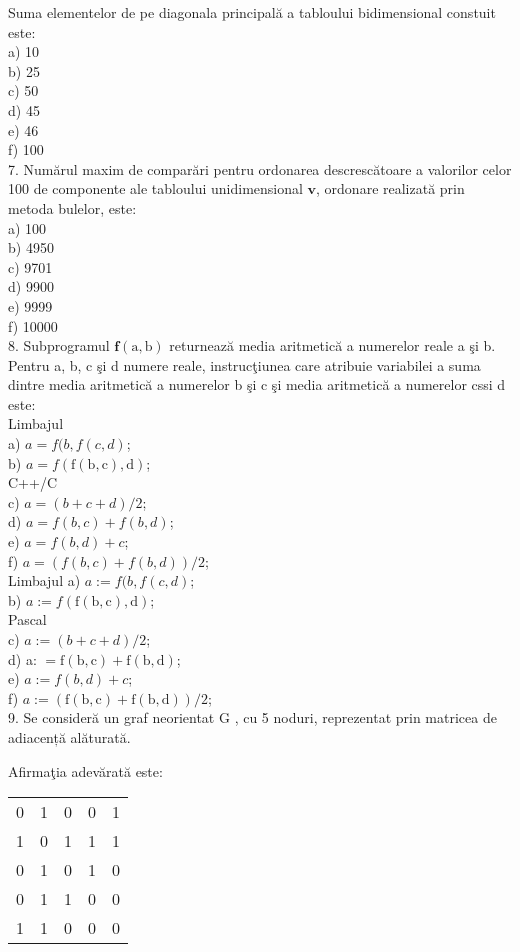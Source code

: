 Suma elementelor de pe diagonala principală a tabloului bidimensional constuit este:\\
a) 10\\
b) 25\\
c) 50\\
d) 45\\
e) 46\\
f) 100\\
7. Numărul maxim de comparări pentru ordonarea descrescătoare a valorilor celor 100 de componente ale tabloului unidimensional $\mathbf{v}$, ordonare realizată prin metoda bulelor, este:\\
a) 100\\
b) 4950\\
c) 9701\\
d) 9900\\
e) 9999\\
f) 10000\\
8. Subprogramul $\mathbf{f}(\mathrm{a}, \mathrm{b})$ returnează media aritmetică a numerelor reale a şi b. Pentru a, b, c şi d numere reale, instrucţiunea care atribuie variabilei a suma dintre media aritmetică a numerelor b şi c şi media aritmetică a numerelor cssi d este:\\
Limbajul\\
a) $a=f(b, f(c, d)$;\\
b) $a=f(\mathrm{f}(\mathrm{b}, \mathrm{c}), \mathrm{d})$;\\
C++/C\\
c) $a=(b+c+d) / 2$;\\
d) $a=f(b, c)+f(b, d)$;\\
e) $a=f(b, d)+c$;\\
f) $a=(f(b, c)+f(b, d)) / 2$;\\
Limbajul a) $a:=f(b, f(c, d)$;\\
b) $a:=f(\mathrm{f}(\mathrm{b}, \mathrm{c}), \mathrm{d})$;\\
Pascal\\
c) $a:=(b+c+d) / 2$;\\
d) a: $=\mathrm{f}(\mathrm{b}, \mathrm{c})+\mathrm{f}(\mathrm{b}, \mathrm{d})$;\\
e) $a:=f(b, d)+c$;\\
f) $a:=(\mathrm{f}(\mathrm{b}, \mathrm{c})+\mathrm{f}(\mathrm{b}, \mathrm{d})) / 2$;\\
9. Se consideră un graf neorientat G , cu 5 noduri, reprezentat prin matricea de adiacență alăturată.

Afirmaţia adevărată este:

\begin{center}
\begin{tabular}{lllll}
0 & 1 & 0 & 0 & 1 \\
1 & 0 & 1 & 1 & 1 \\
0 & 1 & 0 & 1 & 0 \\
0 & 1 & 1 & 0 & 0 \\
1 & 1 & 0 & 0 & 0 \\
\end{tabular}
\end{center}

